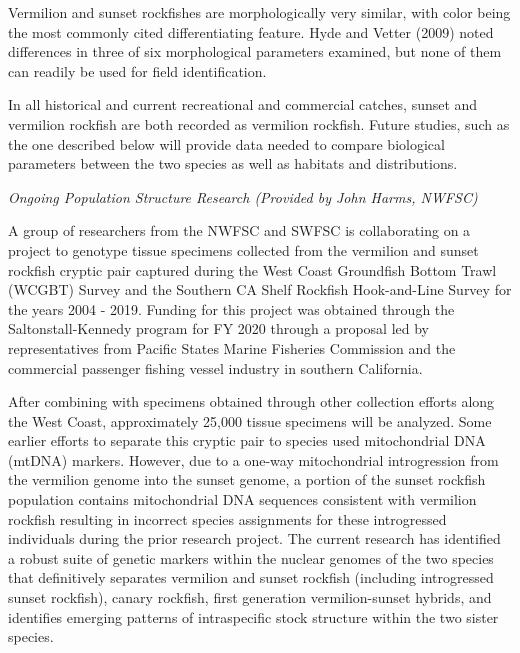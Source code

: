 \documentclass[
  english,
  a4paper,
]{article}
\begin{document}
Vermilion and sunset rockfishes are morphologically very similar, with color being
the most commonly
cited differentiating feature. Hyde and Vetter (2009) noted differences in three of six morphological
parameters examined, but none of them can readily be used for field identification.

In all historical and current recreational and commercial catches, sunset and
vermilion rockfish are both recorded as vermilion rockfish. Future studies,
such as the one described below will provide data needed to compare biological
parameters between the two species as well as habitats and distributions.

\emph{Ongoing Population Structure Research (Provided by John Harms, NWFSC)}

A group of researchers from the NWFSC and SWFSC is collaborating on a project to
genotype tissue specimens collected from the vermilion and sunset rockfish cryptic
pair captured during the West Coast Groundfish Bottom Trawl (WCGBT) Survey and the Southern
CA Shelf Rockfish Hook-and-Line Survey for the years 2004 - 2019. Funding for this
project was obtained through the Saltonstall-Kennedy program for FY 2020 through a
proposal led by representatives from Pacific States Marine Fisheries Commission and
the commercial passenger fishing vessel industry in southern California.

After combining with specimens obtained through other collection efforts along
the West Coast, approximately 25,000 tissue specimens will be analyzed. Some
earlier efforts to separate this cryptic pair to species used mitochondrial DNA
(mtDNA) markers. However, due to a one-way mitochondrial introgression from
the vermilion genome into the sunset genome, a portion of the sunset rockfish
population contains mitochondrial DNA sequences consistent with vermilion rockfish
resulting in incorrect species assignments for these introgressed individuals
during the prior research project. The current research has identified a robust
suite of genetic markers within the nuclear genomes of the two species that
definitively separates vermilion and sunset rockfish (including introgressed
sunset rockfish), canary rockfish, first generation vermilion-sunset hybrids,
and identifies emerging patterns of intraspecific stock structure within the
two sister species.
\end{document}
